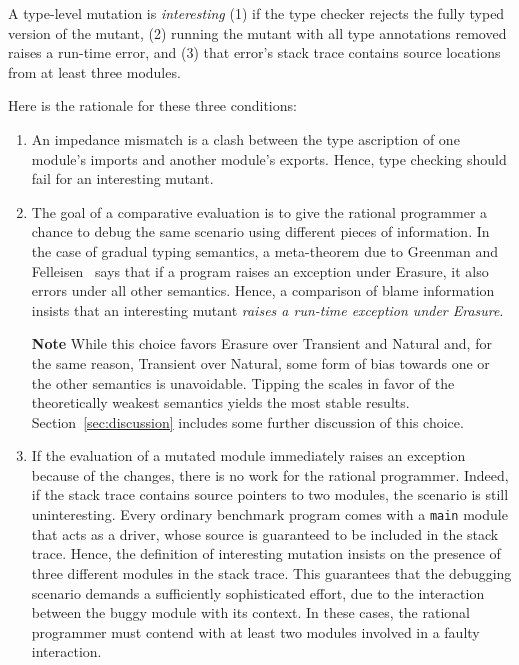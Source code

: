
A type-level mutation is {\em interesting\/} (1) if the type checker rejects the fully typed version of the mutant,
(2) running the mutant with all type annotations removed raises a run-time error, and
(3) that error's stack trace contains source locations from at least three modules.

Here is the rationale for these three conditions:
\begin{enumerate}

\item An impedance mismatch is a clash between the type ascription of one
module's imports and another module's exports. Hence, type checking should fail
for an interesting mutant.

\item The goal of a comparative evaluation is to give the rational programmer a
chance to debug the same scenario using different pieces of information.  In the
case of gradual typing semantics, a meta-theorem due to Greenman and
Felleisen~\citep{gf-icfp-2018} says that if a program raises an exception under
Erasure, it also errors under all other semantics.  Hence, a comparison of blame
information insists that an interesting mutant {\em raises a run-time exception
under Erasure\/}.

{\bf Note} While this choice favors Erasure over Transient and Natural and, for
the same reason, Transient over Natural, some form of bias towards one or the
other semantics is unavoidable. Tipping the scales in favor of the theoretically
weakest semantics yields the most stable results. 
Section~\ref{sec:discussion} includes some further discussion of this choice.


\item If the evaluation of a mutated module immediately raises an exception because
of the changes, there is no work for the rational programmer. Indeed, if the
stack trace contains source pointers to two modules, the scenario is still
uninteresting. Every ordinary benchmark program comes with a {\tt main} module
that acts as a driver, whose source is guaranteed to be included in the stack
trace.  Hence, the definition of interesting mutation insists on the presence of
three different modules in the stack trace. This guarantees that the debugging
scenario demands a sufficiently sophisticated effort, due to the interaction
between the buggy module with its context.  In these cases, the rational
programmer must contend with at least two modules involved in a faulty
interaction.

\end{enumerate}

